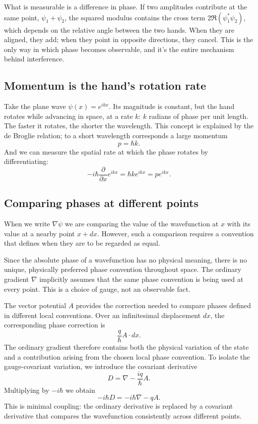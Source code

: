 What is measurable is a difference in phase. If two amplitudes contribute at
the same point, \(\psi_1 + \psi_2\), the squared modulus contains the
cross term \(2 \Re (\psi_1^* \psi_2)\), which depends on the relative angle
between the two hands. When they are aligned, they add; when they point
in opposite directions, they cancel. This is the only way in which
phase becomes observable, and it's the entire mechanism behind interference.

\subsection{Momentum is the hand's rotation rate}
\enlargethispage{0.7cm}
Take the plane wave \(\psi(x) = e^{ikx}\). Its magnitude is constant,
but the hand rotates while advancing in space, at a rate \(k\): \(k\)
radians of phase per unit length. The faster it rotates, the shorter
the wavelength.
This concept is explained by the de Broglie relation; to a short
wavelength corresponds a large momentum
\[
	p = \hbar k.
\]
And we can measure the spatial rate at which the phase rotates
by differentiating:
\[
	-i \hbar \frac{\partial}{\partial x} e^{ikx} = \hbar k e^{ikx} = pe^{ikx}.
\]

\subsection{Comparing phases at different points}

When we write \(\nabla \psi\) we are comparing the value of the
wavefunction at \(x\) with its value at a nearby point \(x + dx\).
However, such a comparison requires a convention that defines when they
are to be regarded as equal.

Since the absolute phase of a wavefunction has no physical meaning, there
is no unique, physically preferred phase convention throughout space.
The ordinary gradient \(\nabla\) implicitly assumes that the same
phase convention is being used at every point. This is a choice of gauge,
not an observable fact.

The vector potential \(A\) provides the correction needed to compare
phases defined in different local conventions. Over an infinitesimal
displacement \(dx\), the corresponding phase correction is
\[
	\frac{q}{\hbar} A \cdot dx.
\]
The ordinary gradient therefore contains both the physical variation of the
state and a contribution arising from the chosen local phase convention.
To isolate the gauge-covariant variation, we introduce the covariant
derivative
\[
	D = \nabla - \frac{iq}{\hbar}A.
\]
Multiplying by \(-i \hbar\) we obtain
\[
	-i \hbar D = - i \hbar \nabla - qA.
\]
This is minimal coupling: the ordinary derivative is replaced by a covariant
derivative that compares the wavefunction consistently across different
points.


